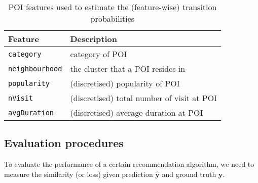 \begin{table}[ht]
\caption{POI features used to estimate the (feature-wise) transition probabilities}
\label{tab:tranfeature}
\centering
\setlength{\tabcolsep}{2pt} %
\begin{tabular}{l|l} \hline
\textbf{Feature}       & \textbf{Description} \\ \hline
\texttt{category}      & category of POI \\
\texttt{neighbourhood} & the cluster that a POI resides in \\
\texttt{popularity}    & (discretised) popularity of POI \\
\texttt{nVisit}        & (discretised) total number of visit at POI \\
\texttt{avgDuration}  & (discretised) average duration at POI \\ \hline
\end{tabular}
\end{table}


\clearpage
\subsection{Evaluation procedures}
\label{sec:metric}

To evaluate the performance of a certain recommendation algorithm,
we need to measure the similarity (or loss) given prediction $\hat{\mathbf{y}}$
and ground truth $\mathbf{y}$.

